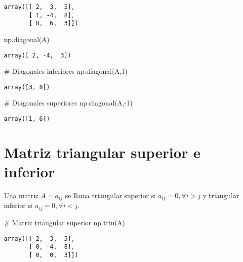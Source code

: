 \documentclass[
  letterpaper,
  DIV=11,
  numbers=noendperiod]{scrreprt}
\newenvironment{Shaded}{\begin{snugshade}}{\end{snugshade}}
\newcommand{\CommentTok}[1]{\textcolor[rgb]{0.37,0.37,0.37}{#1}}
\newcommand{\DecValTok}[1]{\textcolor[rgb]{0.68,0.00,0.00}{#1}}
\newcommand{\NormalTok}[1]{\textcolor[rgb]{0.00,0.23,0.31}{#1}}
\newcommand{\OperatorTok}[1]{\textcolor[rgb]{0.37,0.37,0.37}{#1}}
\begin{document}
\begin{verbatim}
array([[ 2,  3,  5],
       [ 1, -4,  8],
       [ 8,  6,  3]])
\end{verbatim}

\begin{Shaded}
\begin{Highlighting}[]
\NormalTok{np.diagonal(A)}
\end{Highlighting}
\end{Shaded}

\begin{verbatim}
array([ 2, -4,  3])
\end{verbatim}

\begin{Shaded}
\begin{Highlighting}[]
\CommentTok{\# Diagonales inferiores}
\NormalTok{np.diagonal(A,}\DecValTok{1}\NormalTok{)}
\end{Highlighting}
\end{Shaded}

\begin{verbatim}
array([3, 8])
\end{verbatim}

\begin{Shaded}
\begin{Highlighting}[]
\CommentTok{\# Diagonales superiores}
\NormalTok{np.diagonal(A,}\OperatorTok{{-}}\DecValTok{1}\NormalTok{)}
\end{Highlighting}
\end{Shaded}

\begin{verbatim}
array([1, 6])
\end{verbatim}

\section{Matriz triangular superior e
inferior}\label{matriz-triangular-superior-e-inferior}

Una matriz \(A = {a_{ij}}\) se llama triangular superior si
\(a_{ij} = 0, \forall i > j\) y triangular inferior si
\(a_{ij} = 0, \forall i < j\).

\begin{Shaded}
\begin{Highlighting}[]
\CommentTok{\# Matriz triangular superior}
\NormalTok{np.triu(A)}
\end{Highlighting}
\end{Shaded}

\begin{verbatim}
array([[ 2,  3,  5],
       [ 0, -4,  8],
       [ 0,  0,  3]])
\end{verbatim}
\end{document}
